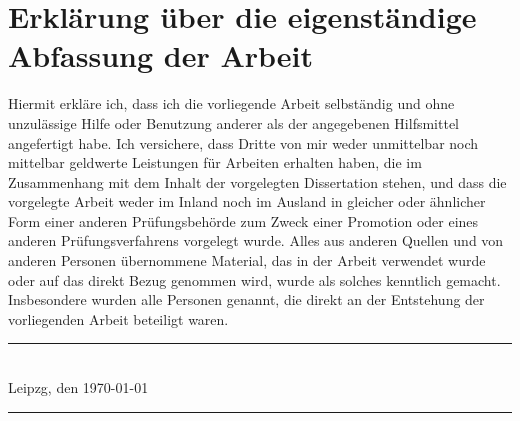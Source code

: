 \clearpage
\thispagestyle{empty}

\section*{Erklärung über die eigenständige Abfassung der Arbeit}

Hiermit erkläre ich, dass ich die vorliegende Arbeit selbständig und ohne unzulässige Hilfe
oder Benutzung anderer als der angegebenen Hilfsmittel angefertigt habe. Ich versichere,
dass Dritte von mir weder unmittelbar noch mittelbar geldwerte Leistungen für Arbeiten
erhalten haben, die im Zusammenhang mit dem Inhalt der vorgelegten Dissertation stehen,
und dass die vorgelegte Arbeit weder im Inland noch im Ausland in gleicher oder ähnlicher
Form einer anderen Prüfungsbehörde zum Zweck einer Promotion oder eines anderen
Prüfungsverfahrens vorgelegt wurde. Alles aus anderen Quellen und von anderen
Personen übernommene Material, das in der Arbeit verwendet wurde oder auf das direkt
Bezug genommen wird, wurde als solches kenntlich gemacht. Insbesondere wurden alle
Personen genannt, die direkt an der Entstehung der vorliegenden Arbeit beteiligt waren.

\vspace{4\baselineskip}

\begin{center}
\begin{minipage}[t]{0.48\textwidth}
\rule{12em}{0.5pt} \\
Leipzg, den \today
\end{minipage} %
\begin{minipage}[t]{0.48\textwidth}
\rule{12em}{0.5pt} \\
\tAuthor
\end{minipage}
\end{center}

